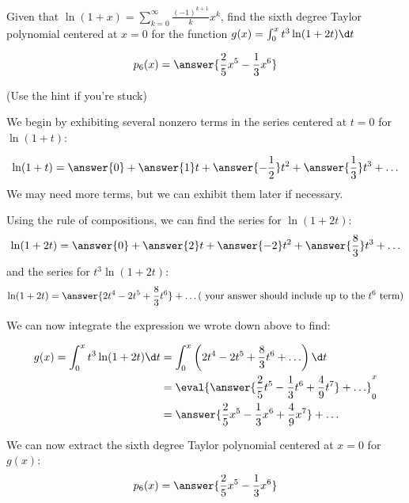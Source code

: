 \documentclass{ximera}
\author{Jim Talamo}
\begin{document}
\begin{exercise}
Given that $\ln(1+x) =\sum_{k=0}^{\infty} \frac{(-1)^{k+1}}{k} x^k$, find the sixth degree Taylor polynomial centered at $x=0$ for the function $g(x) = \int_0^x t^3 \ln(1+2t) \d t$

\[
p_6(x) = \answer{\frac{2}{5}x^5-\frac{1}{3}x^6}
\]

(Use the hint if you're stuck)
\begin{hint}
We begin by exhibiting several nonzero terms in the series centered at $t=0$ for  $\ln(1+t)$:

\[
\ln(1+t) = \answer{0}+\answer{1}t+\answer{-\frac{1}{2}}t^2+\answer{\frac{1}{3}}t^3+\ldots
\]
We may need more terms, but we can exhibit them later if necessary.

\begin{question}
Using the rule of compositions, we can find the series for $\ln(1+2t)$:
\[
\ln(1+2t) = \answer{0}+\answer{2}t+\answer{-2}t^2+\answer{\frac{8}{3}}t^3+\ldots
\]
and the series for $t^3\ln(1+2t)$:
\[
\ln(1+2t) = \answer{2t^4-2t^5+\frac{8}{3}t^6}+\ldots (\textrm{ your answer should include up to the } t^6 \textrm{ term})
\]

\begin{question}
We can now integrate the expression we wrote down above to find:

\begin{align*}
g(x) = \int_0^x t^3 \ln(1+2t) \d t &= \int_0^x \left(2t^4-2t^5+\frac{8}{3}t^6+\ldots\right) \d t \\
&= \eval{\answer{\frac{2}{5}t^5-\frac{1}{3}t^6+\frac{4}{9}t^7} + \ldots }_0^x \\
&= \answer{\frac{2}{5}x^5-\frac{1}{3}x^6+\frac{4}{9}x^7} + \ldots 
\end{align*}

We can now extract the sixth degree Taylor polynomial centered at $x=0$ for $g(x)$:
\[
p_6(x) = \answer{\frac{2}{5}x^5-\frac{1}{3}x^6}
\]

\end{question}
\end{question}
\end{hint}

\end{exercise}
\end{document}
